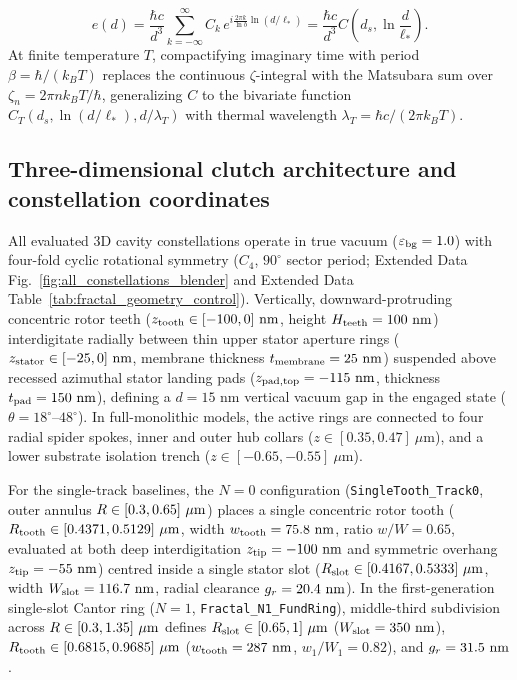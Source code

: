 \documentclass[pdflatex,sn-nature]{sn-jnl}
\begin{document}
\begin{equation}
e(d) = \frac{\hbar c}{d^3} \sum_{k=-\infty}^{\infty} C_k \, e^{i \frac{2\pi k}{\ln b} \ln(d/\ell_*)} = \frac{\hbar c}{d^3} C\!\left(d_s, \ln\frac{d}{\ell_*}\right).
\end{equation}
At finite temperature $T$, compactifying imaginary time with period $\beta = \hbar/(k_B T)$ replaces the continuous $\zeta$-integral with the Matsubara sum over $\zeta_n = 2\pi n k_B T/\hbar$, generalizing $C$ to the bivariate function $C_T(d_s, \ln(d/\ell_*), d/\lambda_T)$ with thermal wavelength $\lambda_T = \hbar c / (2\pi k_B T)$\cite{gordon2026prd}.

\subsection*{Three-dimensional clutch architecture and constellation coordinates}
All evaluated 3D cavity constellations operate in true vacuum ($\varepsilon_{\rm bg}=1.0$) with four-fold cyclic rotational symmetry ($C_4$, $90^\circ$ sector period; Extended Data Fig.~\ref{fig:all_constellations_blender} and Extended Data Table~\ref{tab:fractal_geometry_control}). Vertically, downward-protruding concentric rotor teeth ($z_{\rm tooth} \in [-100, 0]\text{ nm}$, height $H_{\rm teeth} = 100\text{ nm}$) interdigitate radially between thin upper stator aperture rings ($z_{\rm stator} \in [-25, 0]\text{ nm}$, membrane thickness $t_{\rm membrane} = 25\text{ nm}$) suspended above recessed azimuthal stator landing pads ($z_{\rm pad,top} = -115\text{ nm}$, thickness $t_{\rm pad} = 150\text{ nm}$), defining a $d = 15\text{ nm}$ vertical vacuum gap in the engaged state ($\theta = 18^\circ\text{--}48^\circ$). In full-monolithic models, the active rings are connected to four radial spider spokes, inner and outer hub collars ($z \in [0.35, 0.47]\ \mu\text{m}$), and a lower substrate isolation trench ($z \in [-0.65, -0.55]\ \mu\text{m}$).

For the single-track baselines, the $N=0$ configuration (\texttt{SingleTooth\_Track0}, outer annulus $R \in [0.3{}, 0.65{}]\ \mu\text{m}$) places a single concentric rotor tooth ($R_{\rm tooth} \in [0.4371, 0.5129]\ \mu\text{m}$, width $w_{\rm tooth} = 75.8{}\text{ nm}$, ratio $w/W = 0.65$, evaluated at both deep interdigitation $z_{\rm tip} = -100\text{ nm}$ and symmetric overhang $z_{\rm tip} = -55\text{ nm}$) centred inside a single stator slot ($R_{\rm slot} \in [\SingletoothTrackzeroSlotRInUm{}, \SingletoothTrackzeroSlotROutUm{}]\ \mu\text{m}$, width $W_{\rm slot} = 116.7{}\text{ nm}$, radial clearance $g_r = 20.4{}\text{ nm}$). In the first-generation single-slot Cantor ring ($N=1$, \texttt{Fractal\_N1\_FundRing}), middle-third subdivision across $R \in [0.3{}, 1.35{}]\ \mu\text{m}$ defines $R_{\rm slot} \in [0.65{}, 1{}]\ \mu\text{m}$ ($W_{\rm slot} = 350{}\text{ nm}$), $R_{\rm tooth} \in [0.6815, 0.9685]\ \mu\text{m}$ ($w_{\rm tooth} = 287{}\text{ nm}$, $w_1/W_1 = 0.82$), and $g_r = 31.5{}\text{ nm}$.
\end{document}
